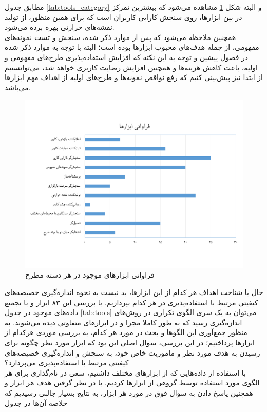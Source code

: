 مطابق جدول
\ref{tab:tools_category}
و البته شکل
\ref{fig:category_tools}
مشاهده می‌شود که بیشترین تمرکز در بین ابزارها، روی سنجش کارایی کاربران است که برای همین منظور، از تولید نقشه‌های حرارتی بهره برده می‌شود.\\
همچنین ملاحظه می‌شود که پس از موارد ذکر شده، سنجش و تست نمونه‌های مفهومی، از جمله هدف‌های محبوب ابزارها بوده است؛ البته با توجه به موارد ذکر شده در فصول پیشین و توجه به این نکته که افزایش استفاده‌پذیری طرح‌های مفهومی و اولیه، باعث کاهش هزینه‌ها و همچنین افزایش رضایت کاربری خواهد شد، می‌توانستیم از ابتدا نیز پیش‌بینی کنیم که رفع نواقص نمونه‌ها و طرح‌های اولیه از اهداف مهم ابزارها می‌باشد.\\
\begin{figure}[H]
	\centering\includegraphics[width=0.8\linewidth]{Resources/tools_category.pdf}
	\caption[فراوانی ابزارهای موجود در هر دسته مطرح]
	{فراوانی ابزارهای موجود در هر دسته مطرح
	}
	\label{fig:category_tools}
\end{figure}
حال با شناخت اهداف هر کدام از این ابزارها، بد نیست به نحوه اندازه‌گیری خصیصه‌های کیفیتی مرتبط با استفاده‌پذیری در هر کدام بپردازیم. با بررسی این ۸۳ ابزار و با تجمیع داده‌های موجود در جدول
\ref{tab:tools}
می‌توان به یک سری الگوی تکراری در روش‌های اندازه‌گیری رسید که به طور کاملا مجزا و در ابزارهای متفاوتی دیده‌ می‌شوند. به منظور جمع‌آوری این الگو‌ها و بحث در مورد هر کدام، به بررسی موردی هرکدام از ابزارها پرداختیم؛ در این بررسی، سوال اصلی این بود که ابزار مورد نظر چگونه برای رسیدن به هدف مورد نظر و ماموریت خاص خود، به سنجش و اندازه‌گیری خصیصه‌های کیفیتی مرتبط با استفاده‌پذیری می‌پردازد؟\\
با استفاده از داده‌هایی که از ابزارهای مختلف داشتیم، سعی در نام‌گذاری برای هر الگوی مورد استفاده توسط گروهی از ابزارها کردیم. با در نظر گرفتن هدف هر ابزار و همچنین پاسخ دادن به سوال فوق در مورد هر ابزار، به نتایج بسیار جالبی رسیدیم که خلاصه آن‌ها در جدول
